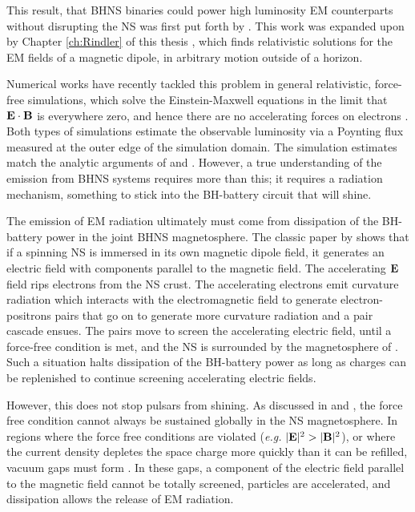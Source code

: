 This result, that BHNS binaries could power high luminosity EM counterparts
without disrupting the NS was first put forth by \cite{McL:2011}. This
work was expanded upon by Chapter \ref{ch:Rindler} of this thesis
\cite{DL:2013}, which finds relativistic solutions for the EM fields of
a magnetic dipole, in arbitrary motion outside of a horizon.

Numerical works have recently tackled this problem in general relativistic,
force-free simulations, which solve the Einstein-Maxwell equations in the
limit that ${\bf E} \cdot {\bf B}$ is everywhere zero, and hence there are no
accelerating forces on electrons \citep{Paschalidis:2013}. Both types of
simulations estimate the observable luminosity via a Poynting flux measured at
the outer edge of the simulation domain. The simulation estimates match the
analytic arguments of \cite{McL:2011} and \cite{DL:2013}. However, a true understanding of the
emission from BHNS systems requires more than this; it requires a radiation
mechanism, something to stick into the BH-battery circuit that will shine.

The emission of EM radiation ultimately must come from dissipation of the BH-
battery power in the joint BHNS magnetosphere. The classic paper by
\cite{GJ:1969} shows that if a spinning NS is immersed in its own magnetic
dipole field, it generates an electric field with components parallel to the
magnetic field. The accelerating ${\bf E}$ field rips electrons from the NS
crust. The accelerating electrons emit curvature radiation which interacts
with the electromagnetic field to generate electron-positrons pairs that go on
to generate more curvature radiation and a pair cascade ensues. The pairs move
to screen the accelerating electric field, until a force-free condition is
met, and the NS is surrounded by the magnetosphere of \citep{GJ:1969}. Such a
situation halts dissipation of the BH-battery power as long as charges can be
replenished to continue screening accelerating electric fields.

However, this does not stop pulsars from shining. As discussed in
\citep{Sturrock:1971} and \citep{RudSuth:1975}, the force free condition
cannot always be sustained globally in the NS magnetosphere. In regions where
the force free conditions are violated (\textit{e.g.} $|{\bf E}|^2 > |{\bf B}|^2$),
or where the current density depletes the space charge more quickly than it can be
refilled, vacuum gaps must form \citep[\textit{e.g.}][]{DaughertyHarding:1982,
ChengRuderman:1986}. In these gaps, a component of the electric field parallel
to the magnetic field cannot be totally screened, particles are accelerated,
and dissipation allows the release of EM radiation.


